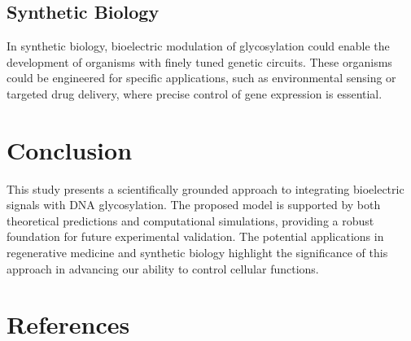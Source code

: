 \documentclass[12pt]{article}
\begin{document}
\subsection{Synthetic Biology}
In synthetic biology, bioelectric modulation of glycosylation could enable the development of organisms with finely tuned genetic circuits. These organisms could be engineered for specific applications, such as environmental sensing or targeted drug delivery, where precise control of gene expression is essential.

\section{Conclusion}
This study presents a scientifically grounded approach to integrating bioelectric signals with DNA glycosylation. The proposed model is supported by both theoretical predictions and computational simulations, providing a robust foundation for future experimental validation. The potential applications in regenerative medicine and synthetic biology highlight the significance of this approach in advancing our ability to control cellular functions.

\section{References}



\end{document}
